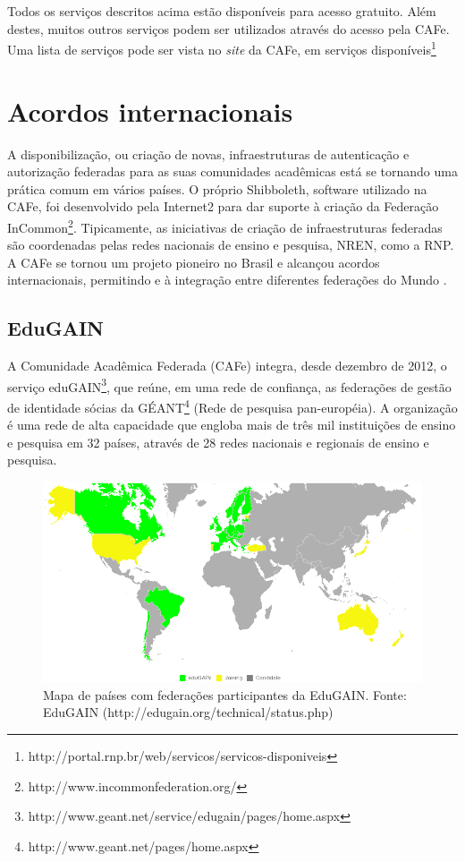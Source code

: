 Todos os serviços descritos acima estão disponíveis para acesso gratuito. Além destes, muitos outros serviços podem ser utilizados através do acesso pela CAFe. Uma lista de serviços pode ser vista no \textit{site} da CAFe, em serviços disponíveis\footnote{http://portal.rnp.br/web/servicos/servicos-disponiveis}

\section{Acordos internacionais}
\label{s_c3_acordos}

A disponibilização, ou criação de novas, infraestruturas de autenticação e autorização federadas para as suas comunidades acadêmicas está se tornando uma prática comum em vários países. O próprio Shibboleth, software utilizado na CAFe, foi desenvolvido pela Internet2 para dar suporte à criação da Federação InCommon\footnote{http://www.incommonfederation.org/}. Tipicamente, as iniciativas de criação de infraestruturas federadas são coordenadas pelas redes nacionais de ensino e pesquisa, \ac{NREN}, como a RNP. A CAFe se tornou um projeto pioneiro no Brasil e alcançou acordos internacionais, permitindo e à integração entre diferentes federações do Mundo \cite{rnp:13}.

\subsection{EduGAIN}
\label{ss_c3_edugain}

A Comunidade Acadêmica Federada (CAFe) integra, desde dezembro de 2012, o serviço eduGAIN\footnote{http://www.geant.net/service/edugain/pages/home.aspx}, que reúne, em uma rede de confiança, as federações de gestão de identidade sócias da GÉANT\footnote{http://www.geant.net/pages/home.aspx} (Rede de pesquisa pan-européia). A organização é uma rede de alta capacidade que engloba mais de três mil instituições de ensino e pesquisa em 32 países, através de 28 redes nacionais e regionais de ensino e pesquisa.

\begin{figure}[!htpb]
 \centering
 \includegraphics[width=1\textwidth]{figuras/edugain2.png}
 \caption{Mapa de países com federações participantes da EduGAIN. Fonte: EduGAIN (http://edugain.org/technical/status.php)}
 \label{fig_6}
\end{figure}

